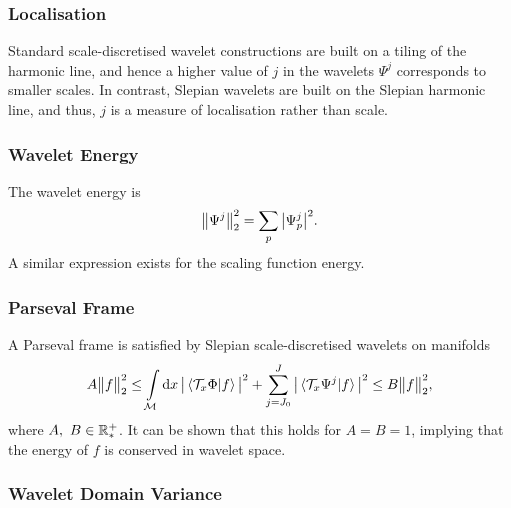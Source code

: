 \subsubsection{Localisation}\label{sec:chapter5_localisation}

Standard scale-discretised wavelet constructions are built on a tiling of the harmonic line, and hence a higher value of \(j\) in the wavelets \(\Psi^{j}\) corresponds to smaller scales.
In contrast, Slepian wavelets are built on the Slepian harmonic line, and thus, \(j\) is a measure of localisation rather than scale.

\subsubsection{Wavelet Energy}

The wavelet energy is
%
\begin{equation}
	{\big\lVert\Psi^{j}\big\rVert}_{2}^{2}
	= \displaystyle\sum\limits_{p} \big\lvert{\Psi}_{p}^{j}\big\rvert^{2}.
\end{equation}
%
A similar expression exists for the scaling function energy.

\subsubsection{Parseval Frame}

A Parseval frame is satisfied by Slepian scale-discretised wavelets on manifolds
%
\begin{equation}
	A{\big\lVert f\big\rVert}_{2}^{2} \leq \displaystyle\int\limits_{\mathcal{M}} \dd{x}
	\big\lvert\braket*{\mathcal{T}_{x}\Phi}{f}\big\rvert^{2}
	+ \displaystyle\sum\limits_{j=J_{0}}^{J} \big\lvert\braket*{\mathcal{T}_{x}\Psi^{j}}{f}\big\rvert^{2}
	\leq B{\big\lVert f\big\rVert}_{2}^{2},
\end{equation}
%
where \(A,\ B \in \mathbb{R}_{\ast}^{+}{}\).
It can be shown that this holds for \(A = B = 1\), implying that the energy of \(f\) is conserved in wavelet space.

\subsubsection{Wavelet Domain Variance}

